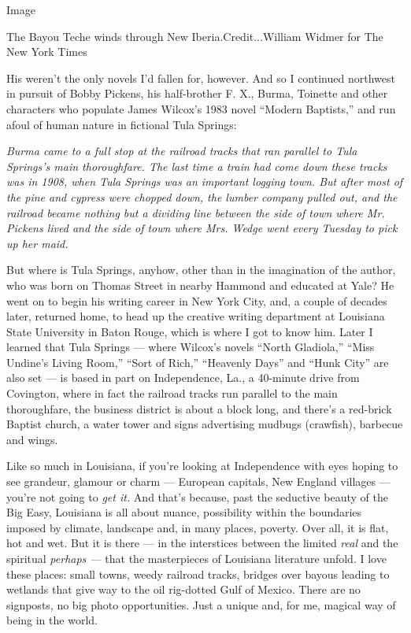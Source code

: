 Image

The Bayou Teche winds through New Iberia.Credit...William Widmer for The
New York Times

His weren't the only novels I'd fallen for, however. And so I continued
northwest in pursuit of Bobby Pickens, his half-brother F. X., Burma,
Toinette and other characters who populate James Wilcox's 1983 novel
``Modern Baptists,'' and run afoul of human nature in fictional Tula
Springs:

\emph{Burma came to a full stop at the railroad tracks that ran parallel
to Tula Springs's main thoroughfare. The last time a train had come down
these tracks was in 1908, when Tula Springs was an important logging
town. But after most of the pine and cypress were chopped down, the
lumber company pulled out, and the railroad became nothing but a
dividing line between the side of town where Mr. Pickens lived and the
side of town where Mrs. Wedge went every Tuesday to pick up her maid.}

But where is Tula Springs, anyhow, other than in the imagination of the
author, who was born on Thomas Street in nearby Hammond and educated at
Yale? He went on to begin his writing career in New York City, and, a
couple of decades later, returned home, to head up the creative writing
department at Louisiana State University in Baton Rouge, which is where
I got to know him. Later I learned that Tula Springs --- where Wilcox's
novels ``North Gladiola,'' ``Miss Undine's Living Room,'' ``Sort of
Rich,'' ``Heavenly Days'' and ``Hunk City'' are also set --- is based in
part on Independence, La., a 40-minute drive from Covington, where in
fact the railroad tracks run parallel to the main thoroughfare, the
business district is about a block long, and there's a red-brick Baptist
church, a water tower and signs advertising mudbugs (crawfish), barbecue
and wings.

Like so much in Louisiana, if you're looking at Independence with eyes
hoping to see grandeur, glamour or charm --- European capitals, New
England villages --- you're not going to \emph{get it.} And that's
because, past the seductive beauty of the Big Easy, Louisiana is all
about nuance, possibility within the boundaries imposed by climate,
landscape and, in many places, poverty. Over all, it is flat, hot and
wet. But it is there --- in the interstices between the limited
\emph{real} and the spiritual \emph{perhaps ---} that the masterpieces
of Louisiana literature unfold. I love these places: small towns, weedy
railroad tracks, bridges over bayous leading to wetlands that give way
to the oil rig-dotted Gulf of Mexico. There are no signposts, no big
photo opportunities. Just a unique and, for me, magical way of being in
the world.

